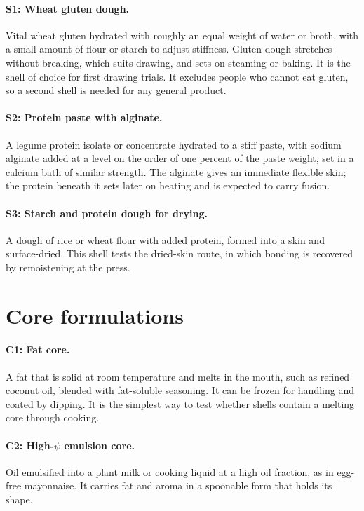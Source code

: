 \documentclass[11pt,openany]{book}
\theoremstyle{definition}
\begin{document}
\paragraph{S1: Wheat gluten dough.} Vital wheat gluten hydrated with roughly an equal weight of water or broth, with a small amount of flour or starch to adjust stiffness. Gluten dough stretches without breaking, which suits drawing, and sets on steaming or baking. It is the shell of choice for first drawing trials. It excludes people who cannot eat gluten, so a second shell is needed for any general product.

\paragraph{S2: Protein paste with alginate.} A legume protein isolate or concentrate hydrated to a stiff paste, with sodium alginate added at a level on the order of one percent of the paste weight, set in a calcium bath of similar strength. The alginate gives an immediate flexible skin; the protein beneath it sets later on heating and is expected to carry fusion.

\paragraph{S3: Starch and protein dough for drying.} A dough of rice or wheat flour with added protein, formed into a skin and surface-dried. This shell tests the dried-skin route, in which bonding is recovered by remoistening at the press.

\section{Core formulations}

\paragraph{C1: Fat core.} A fat that is solid at room temperature and melts in the mouth, such as refined coconut oil, blended with fat-soluble seasoning. It can be frozen for handling and coated by dipping. It is the simplest way to test whether shells contain a melting core through cooking.

\paragraph{C2: High-$\psi$ emulsion core.} Oil emulsified into a plant milk or cooking liquid at a high oil fraction, as in egg-free mayonnaise. It carries fat and aroma in a spoonable form that holds its shape.
\end{document}
